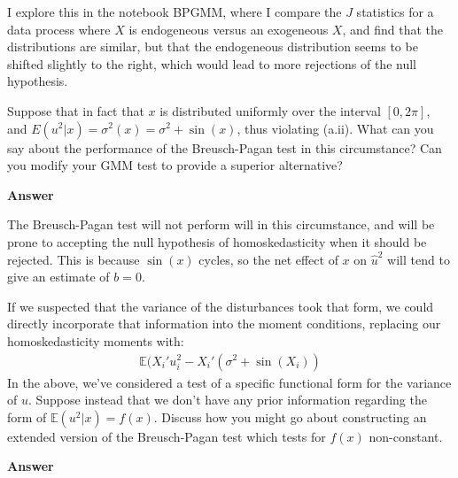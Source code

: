 \documentclass[11pt]{exam}
\begin{document}
\begin{questions}
I explore this in the notebook BPGMM, where I compare the $J$ statistics for a data process where $X$ is endogeneous versus an exogeneous $X$, and find that the distributions are similar, but that the endogeneous distribution seems to be shifted slightly to the right, which would lead to more rejections of the null hypothesis. 

    \question Suppose that in fact that \(x\) is distributed uniformly
over the interval \([0,2\pi]\), and \(E(u^2|x) = \sigma^2(x) = \sigma^2 + \sin(x)\), thus violating (a.ii). What can you say about the performance of the Breusch-Pagan test in this circumstance? Can you modify your GMM test to provide a superior
alternative?

\textbf{Answer}

The Breusch-Pagan test will not perform will in this circumstance, and
will be prone to accepting the null hypothesis of homoskedasticity when
it should be rejected. This is because \(\sin(x)\) cycles, so the net
effect of \(x\) on \(\hat{u}^2\) will tend to give an estimate of
\(b=0\).

If we suspected that the variance of the disturbances took that form, we
could directly incorporate that information into the moment conditions,
replacing our homoskedasticity moments with:
\begin{align*}
\mathbb{E}(X_i'u_i^2 - X_i'(\sigma^2 +\sin(X_i))
\end{align*}
    \question In the above, we've considered a test of a specific
functional form for the variance of \(u\). Suppose instead that we don't
have any prior information regarding the form of
\(\mathbb{E}(u^2|x) = f(x)\). Discuss how you might go about
constructing an extended version of the Breusch-Pagan test which tests
for \(f(x)\) non-constant.

\textbf{Answer}


\end{questions}
\end{document}
